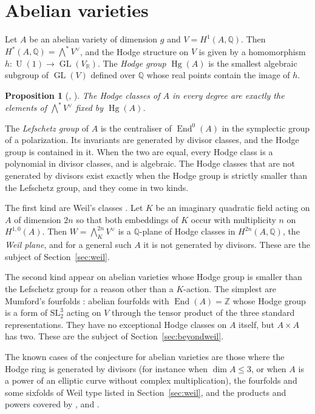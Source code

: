 \documentclass[11pt]{amsart}
\newtheorem{proposition}[theorem]{Proposition}
\theoremstyle{definition}
\theoremstyle{remark}
\newcommand{\QQ}{\mathbb{Q}}
\newcommand{\RR}{\mathbb{R}}
\newcommand{\ZZ}{\mathbb{Z}}
\newcommand{\End}{\operatorname{End}}
\newcommand{\Hg}{\operatorname{Hg}}
\newcommand{\U}{\operatorname{U}}
\begin{document}
\section{Abelian varieties}\label{sec:abelian}

Let $A$ be an abelian variety of dimension $g$ and $V=H^{1}(A,\QQ)$. Then
$H^{*}(A,\QQ)=\bigwedge^{*}V^{\vee}$, and the Hodge structure on $V$ is given by
a homomorphism $h\colon\U(1)\to\operatorname{GL}(V_{\RR})$. The \emph{Hodge
group} $\Hg(A)$ is the smallest algebraic subgroup of $\operatorname{GL}(V)$
defined over $\QQ$ whose real points contain the image of $h$.

\begin{proposition}[{\cite[Section~4]{BhH8}, \cite{Del82}}]\label{prop:invariants}
The Hodge classes of $A$ in every degree are exactly the elements of
$\bigwedge^{*}V^{\vee}$ fixed by $\Hg(A)$.
\end{proposition}

The \emph{Lefschetz group} of $A$ is the centraliser of $\End^{0}(A)$ in the
symplectic group of a polarization. Its invariants are generated by divisor
classes, and the Hodge group is contained in it. When the two are equal,
every Hodge class is a polynomial in divisor classes, and is algebraic. The
Hodge classes that are not generated by divisors exist exactly when the Hodge
group is strictly smaller than the Lefschetz group, and they come in two
kinds.

The first kind are Weil's classes \cite{Wei77}. Let $K$ be an imaginary
quadratic field acting on $A$ of dimension $2n$ so that both embeddings of
$K$ occur with multiplicity $n$ on $H^{1,0}(A)$. Then
$W=\bigwedge^{2n}_{K}V^{\vee}$ is a $\QQ$-plane of Hodge classes in
$H^{2n}(A,\QQ)$, the \emph{Weil plane}, and for a general such $A$ it is not
generated by divisors. These are the subject of Section~\ref{sec:weil}.

The second kind appear on abelian varieties whose Hodge group is smaller than
the Lefschetz group for a reason other than a $K$-action. The simplest are
Mumford's fourfolds \cite{Mum69}: abelian fourfolds with
$\End(A)=\ZZ$ whose Hodge group is a form of $\mathrm{SL}_{2}^{3}$ acting on
$V$ through the tensor product of the three standard representations. They
have no exceptional Hodge classes on $A$ itself, but $A\times A$ has two.
These are the subject of Section~\ref{sec:beyondweil}.

The known cases of the conjecture for abelian varieties are those where the
Hodge ring is generated by divisors (for instance when $\dim A\le3$, or when
$A$ is a power of an elliptic curve without complex multiplication), the
fourfolds and some sixfolds of Weil type listed in Section~\ref{sec:weil},
and the products and powers covered by \cite{MZ99}, \cite{RM08} and
\cite{Fl25}.
\end{document}
